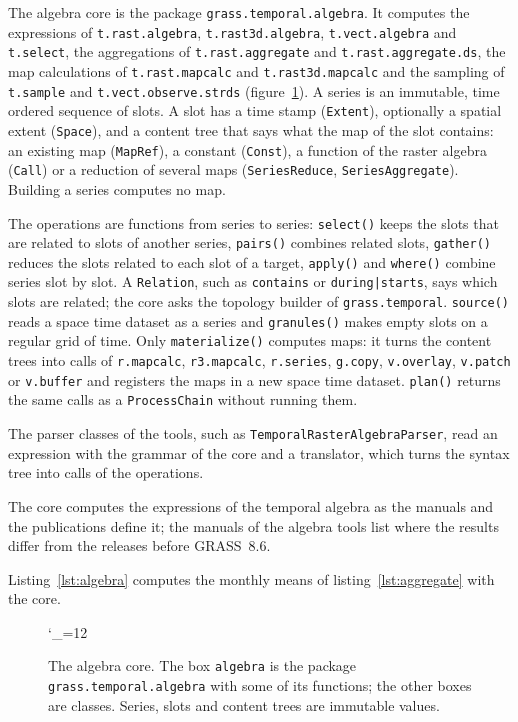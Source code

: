 \documentclass[10pt,a4paper]{article}
\newcommand{\umlfigure}[1]{%
  \begingroup\catcode`\_=12 \ttfamily\endgroup}
\newcommand{\code}[1]{\texttt{#1}}
\begin{document}
The algebra core is the package \code{grass.temporal.algebra}. It computes the
expressions of \code{t.rast.algebra}, \code{t.rast3d.algebra}, \code{t.vect.algebra} and
\code{t.select}, the aggregations of \code{t.rast.aggregate} and
\code{t.rast.aggregate.ds}, the map calculations of \code{t.rast.mapcalc} and
\code{t.rast3d.mapcalc} and the sampling of \code{t.sample} and
\code{t.vect.observe.strds} (figure~\ref{fig:algebra}). A series is an
immutable, time ordered sequence of slots. A slot has a time stamp
(\code{Extent}), optionally a spatial extent (\code{Space}), and a content tree
that says what the map of the slot contains: an existing map (\code{MapRef}),
a constant (\code{Const}), a function of the raster algebra (\code{Call}) or a
reduction of several maps (\code{SeriesReduce}, \code{SeriesAggregate}).
Building a series computes no map.

The operations are functions from series to series: \code{select()} keeps the
slots that are related to slots of another series, \code{pairs()} combines
related slots, \code{gather()} reduces the slots related to each slot of a
target, \code{apply()} and \code{where()} combine series slot by slot. A
\code{Relation}, such as \code{contains} or \code{during|starts}, says which
slots are related; the core asks the topology builder of
\code{grass.temporal}. \code{source()} reads a space time dataset as a series
and \code{granules()} makes empty slots on a regular grid of time. Only
\code{materialize()} computes maps: it turns the content trees into calls of
\code{r.mapcalc}, \code{r3.mapcalc}, \code{r.series}, \code{g.copy},
\code{v.overlay}, \code{v.patch} or \code{v.buffer} and registers the maps in
a new space time dataset. \code{plan()} returns the same calls as a
\code{ProcessChain} without running them.

The parser classes of the tools, such as \code{TemporalRasterAlgebraParser},
read an expression with the grammar of the core and a translator, which turns
the syntax tree into calls of the operations.

The core computes the expressions of the temporal algebra as the manuals and
the publications define it; the manuals of the algebra tools list where the
results differ from the releases before GRASS~8.6.

Listing~\ref{lst:algebra} computes the monthly means of
listing~\ref{lst:aggregate} with the core.

\begin{figure}[ht]
\centering
\umlfigure{algebra}
\caption{The algebra core. The box \code{algebra} is the package
\code{grass.temporal.algebra} with some of its functions; the other boxes are
classes. Series, slots and content trees are immutable values.}
\label{fig:algebra}
\end{figure}
\end{document}
